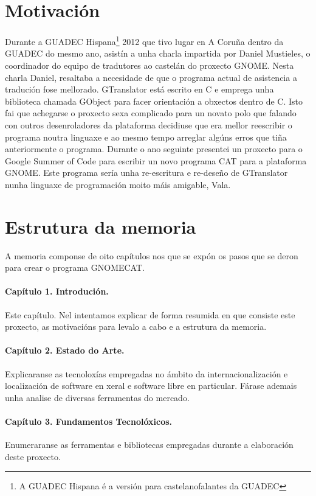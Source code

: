\section{Motivación}
Durante a GUADEC Hispana\footnote{A GUADEC Hispana é a versión para castelanofalantes da GUADEC} 2012 que tivo lugar en A Coruña dentro da GUADEC do mesmo ano, asistín a unha charla impartida por Daniel Mustieles, o coordinador do equipo de tradutores ao castelán do proxecto GNOME. Nesta charla Daniel, resaltaba a necesidade de que o programa actual de asistencia a tradución fose mellorado. GTranslator está escrito en C e emprega unha biblioteca chamada GObject para facer orientación a obxectos dentro de C. Isto fai que achegarse o proxecto sexa complicado para un novato polo que falando con outros desenroladores da plataforma decidiuse que era mellor reescribir o programa noutra linguaxe e ao mesmo tempo arreglar algúns erros que tiña anteriormente o programa. Durante o ano seguinte presentei un proxecto para o Google Summer of Code para escribir un novo programa CAT para a plataforma GNOME. Este programa sería unha re-escritura e re-deseño de GTranslator nunha linguaxe de programación moito máis amigable, Vala.

\section{Estrutura da memoria}

A memoria componse de oito capítulos nos que se expón os pasos que se deron para crear o programa GNOMECAT.

\paragraph*{Capítulo 1. Introdución.}
Este capítulo. Nel intentamos explicar de forma resumida en que consiste este proxecto, as motivacións para levalo a cabo e a estrutura da memoria.

\paragraph*{Capítulo 2. Estado do Arte.}
Explicaranse as tecnoloxías empregadas no ámbito da internacionalización e localización de software en xeral e software libre en particular. Fárase ademais unha analise de diversas ferramentas do mercado.

\paragraph*{Capítulo 3. Fundamentos Tecnolóxicos.}
Enumeraranse as ferramentas e bibliotecas empregadas durante a elaboración deste proxecto.

